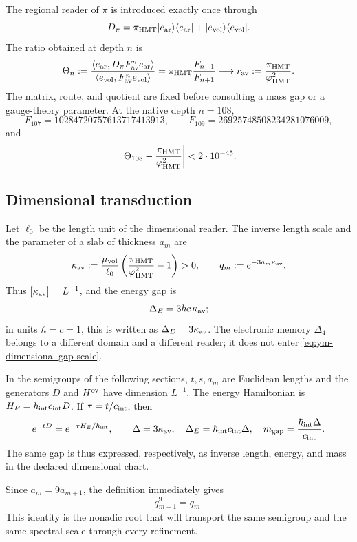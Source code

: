 The regional reader of \(\pi\) is introduced exactly once through
\begin{equation}
 D_\pi
 =\pi_{\rm HMT}|e_{\rm ar}\rangle\langle e_{\rm ar}|
  +|e_{\rm vol}\rangle\langle e_{\rm vol}|.
 \label{eq:ym-pi-regional-reader}
\end{equation}
The ratio obtained at depth \(n\) is
\begin{equation}
 \Theta_n
 :=\frac{\langle e_{\rm ar},D_\pi F_{\rm av}^{n}e_{\rm ar}\rangle}
 {\langle e_{\rm vol},F_{\rm av}^{n}e_{\rm vol}\rangle}
 =\pi_{\rm HMT}\frac{F_{n-1}}{F_{n+1}}
 \longrightarrow
 r_{\rm av}:=\frac{\pi_{\rm HMT}}{\varphi_{\rm HMT}^{2}}.
 \label{eq:ym-target-free-av-limit}
\end{equation}
The matrix, route, and quotient are fixed before consulting a mass
gap or a gauge-theory parameter. At the native depth \(n=108\),
\begin{equation}
 F_{107}=10284720757613717413913,
 \qquad
 F_{109}=26925748508234281076009,
 \label{eq:ym-fibonacci-107-109}
\end{equation}
and
\begin{equation}
 \left|\Theta_{108}
 -\frac{\pi_{\rm HMT}}{\varphi_{\rm HMT}^{2}}\right|
 <2\cdot10^{-45}.
 \label{eq:ym-av-depth-108-error}
\end{equation}

\subsection{Dimensional transduction}

Let \(\ell_0\) be the length unit of the dimensional reader. The inverse
length scale and the parameter of a slab of thickness \(a_m\) are
\begin{equation}
 \kappa_{\rm av}
 :=\frac{\mu_{\rm vol}}{\ell_0}
 \left(\frac{\pi_{\rm HMT}}{\varphi_{\rm HMT}^{2}}-1\right)>0,
 \qquad
 q_m:=e^{-3a_m\kappa_{\rm av}}.
 \label{eq:ym-dimensional-gap-scale}
\end{equation}
Thus \([\kappa_{\rm av}]=L^{-1}\), and the energy gap is
\begin{equation}
 \Delta_E=3\hbar c\,\kappa_{\rm av};
 \label{eq:ym-energy-gap-units}
\end{equation}
in units \(\hbar=c=1\), this is written as \(\Delta_E=3\kappa_{\rm av}\).
The electronic memory \(\Delta_4\) belongs to a different domain and a different
reader; it does not enter \eqref{eq:ym-dimensional-gap-scale}.

In the semigroups of the following sections, \(t,s,a_m\) are
Euclidean lengths and the generators \(D\) and \(H^{\rm ov}\) have
dimension \(L^{-1}\). The energy Hamiltonian is
\(H_E=\hbar_{\rm int}c_{\rm int}D\). If
\(\tau=t/c_{\rm int}\), then
\[
 e^{-tD}=e^{-\tau H_E/\hbar_{\rm int}},\qquad
 \Delta=3\kappa_{\rm av},\quad
 \Delta_E=\hbar_{\rm int}c_{\rm int}\Delta,\quad
 m_{\rm gap}=\frac{\hbar_{\rm int}\Delta}{c_{\rm int}}.
\]
The same gap is thus expressed, respectively, as inverse
length, energy, and mass in the declared dimensional chart.

Since \(a_m=9a_{m+1}\), the definition immediately gives
\begin{equation}
 q_{m+1}^{9}=q_m.
 \label{eq:ym-nonadic-gap-root}
\end{equation}
This identity is the nonadic root that will transport the same semigroup and
the same spectral scale through every refinement.
